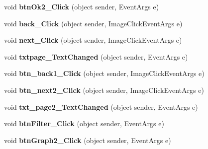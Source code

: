 \begin{DoxyCompactItemize}
\item 
\hypertarget{classusertrackothers__heartrate_a536c819cd392c778424e533ee73ba33a}{void {\bfseries btn\-Ok2\-\_\-\-Click} (object sender, Event\-Args e)}\label{classusertrackothers__heartrate_a536c819cd392c778424e533ee73ba33a}

\item 
\hypertarget{classusertrackothers__heartrate_ad01173029c9f924823ee20eac3df5152}{void {\bfseries back\-\_\-\-Click} (object sender, Image\-Click\-Event\-Args e)}\label{classusertrackothers__heartrate_ad01173029c9f924823ee20eac3df5152}

\item 
\hypertarget{classusertrackothers__heartrate_a6e67e9ca2c0d7e78a54c811e8839b348}{void {\bfseries next\-\_\-\-Click} (object sender, Image\-Click\-Event\-Args e)}\label{classusertrackothers__heartrate_a6e67e9ca2c0d7e78a54c811e8839b348}

\item 
\hypertarget{classusertrackothers__heartrate_aec078fdeb442c6874c920fa0dd518c7c}{void {\bfseries txtpage\-\_\-\-Text\-Changed} (object sender, Event\-Args e)}\label{classusertrackothers__heartrate_aec078fdeb442c6874c920fa0dd518c7c}

\item 
\hypertarget{classusertrackothers__heartrate_abace861fb1f12d24cd9c39bc5c2464c7}{void {\bfseries btn\-\_\-back1\-\_\-\-Click} (object sender, Image\-Click\-Event\-Args e)}\label{classusertrackothers__heartrate_abace861fb1f12d24cd9c39bc5c2464c7}

\item 
\hypertarget{classusertrackothers__heartrate_a7bcaa5f4eb46e26ce7f5762ae2c0868e}{void {\bfseries btn\-\_\-next2\-\_\-\-Click} (object sender, Image\-Click\-Event\-Args e)}\label{classusertrackothers__heartrate_a7bcaa5f4eb46e26ce7f5762ae2c0868e}

\item 
\hypertarget{classusertrackothers__heartrate_aa14e0f053ac06701817ff9cf6759cf35}{void {\bfseries txt\-\_\-page2\-\_\-\-Text\-Changed} (object sender, Event\-Args e)}\label{classusertrackothers__heartrate_aa14e0f053ac06701817ff9cf6759cf35}

\item 
\hypertarget{classusertrackothers__heartrate_a523b9379cabd590307ba30abd6ad84ab}{void {\bfseries btn\-Filter\-\_\-\-Click} (object sender, Event\-Args e)}\label{classusertrackothers__heartrate_a523b9379cabd590307ba30abd6ad84ab}

\item 
\hypertarget{classusertrackothers__heartrate_a867da3757479affd3b0e623bfed9ac52}{void {\bfseries btn\-Graph2\-\_\-\-Click} (object sender, Event\-Args e)}\label{classusertrackothers__heartrate_a867da3757479affd3b0e623bfed9ac52}


\end{DoxyCompactItemize}

